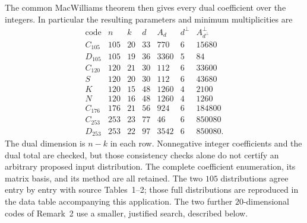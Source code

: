 The common MacWilliams theorem \cite[Theorem~7.1]{U} then gives every dual
coefficient over the integers. In particular the resulting parameters
and minimum multiplicities are
\[
\begin{array}{c|r|r|r|r|r|r}
\text{code}&n&k&d&A_d&d^\perp&A_{d^\perp}^\perp\\\hline
C_{105}&105&20&33&770&6&15680\\
D_{105}&105&19&36&3360&5&84\\
C_{120}&120&21&30&112&6&33600\\
S&120&20&30&112&6&43680\\
K&120&15&48&1260&4&2100\\
N&120&16&48&1260&4&1260\\
C_{176}&176&21&56&924&6&184800\\
C_{253}&253&23&77&46&6&850080\\
D_{253}&253&22&97&3542&6&850080.
\end{array}                                                     \tag{4}
\]
The dual dimension is $n-k$ in each row. Nonnegative integer coefficients
and the dual total are checked, but those consistency checks alone do
not certify an arbitrary proposed input distribution. The complete
coefficient enumeration, its matrix basis, and its method are all retained.
The two $105$ distributions agree entry by entry with source Tables~1--2;
those full distributions are reproduced in the data table accompanying
this application. The two further $20$-dimensional codes of Remark~2 use
a smaller, justified search, described below.
